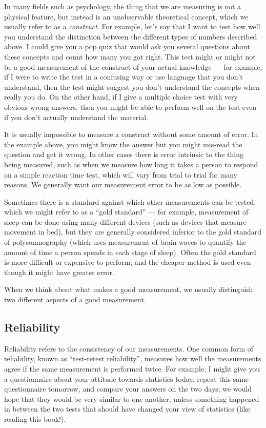 \documentclass[12pt,]{book}
\theoremstyle{definition}
\theoremstyle{definition}
\theoremstyle{definition}
\theoremstyle{remark}
\begin{document}
In many fields such as psychology, the thing that we are measuring is not a physical feature, but instead is an unobservable theoretical concept, which we usually refer to as a \emph{construct}. For example, let's say that I want to test how well you understand the distinction between the different types of numbers described above. I could give you a pop quiz that would ask you several questions about these concepts and count how many you got right. This test might or might not be a good measurement of the construct of your actual knowledge --- for example, if I were to write the test in a confusing way or use language that you don't understand, then the test might suggest you don't understand the concepts when really you do. On the other hand, if I give a multiple choice test with very obvious wrong answers, then you might be able to perform well on the test even if you don't actually understand the material.

It is usually impossible to measure a construct without some amount of error. In the example above, you might know the answer but you might mis-read the question and get it wrong. In other cases there is error intrinsic to the thing being measured, such as when we measure how long it takes a person to respond on a simple reaction time test, which will vary from trial to trial for many reasons. We generally want our measurement error to be as low as possible.

Sometimes there is a standard against which other measurements can be tested, which we might refer to as a ``gold standard'' --- for example, measurement of sleep can be done using many different devices (such as devices that measure movement in bed), but they are generally considered inferior to the gold standard of polysomnography (which uses measurement of brain waves to quantify the amount of time a person spends in each stage of sleep). Often the gold standard is more difficult or expensive to perform, and the cheaper method is used even though it might have greater error.

When we think about what makes a good measurement, we usually distinguish two different aspects of a good measurement.

\hypertarget{reliability}{%
\subsection{Reliability}\label{reliability}}

Reliability refers to the consistency of our measurements. One common form of reliability, known as ``test-retest reliability'', measures how well the measurements agree if the same measurement is performed twice. For example, I might give you a questionnaire about your attitude towards statistics today, repeat this same questionnaire tomorrow, and compare your answers on the two days; we would hope that they would be very similar to one another, unless something happened in between the two tests that should have changed your view of statistics (like reading this book!).
\end{document}
